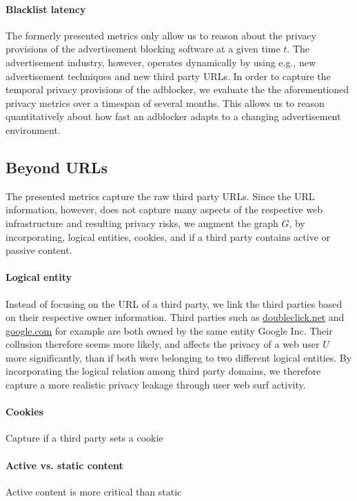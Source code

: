 \documentclass{sig-alternate}
\begin{document}
\paragraph{Blacklist latency}
The formerly presented metrics only allow us to reason about the privacy provisions of the advertisement blocking software at a given time $t$. The advertisement industry, however, operates dynamically by using e.g., new advertisement techniques and new third party URLs. In order to capture the temporal privacy provisions of the adblocker, we evaluate the the aforementioned privacy metrics over a timespan of several months. This allows us to reason quantitatively about how fast an adblocker adapts to a changing advertisement environment.

\subsection{Beyond URLs}
The presented metrics capture the raw third party URLs. Since the URL information, however, does not capture many aspects of the respective web infrastructure and resulting privacy risks, we augment the graph $G$, by incorporating, logical entities, cookies, and if a third party contains active or passive content.

\paragraph{Logical entity}
Instead of focusing on the URL of a third party, we link the third parties based on their respective owner information. Third parties such as \url{doubleclick.net} and \url{google.com} for example are both owned by the same entity Google Inc. Their collusion therefore seems more likely, and affects the privacy of a web user $U$ more significantly, than if both were belonging to two different logical entities. By incorporating the logical relation among third party domains, we therefore capture a more realistic privacy leakage through user web surf activity.

\paragraph{Cookies}
Capture if a third party sets a cookie

\paragraph{Active vs. static content}
Active content is more critical than static
\end{document}
